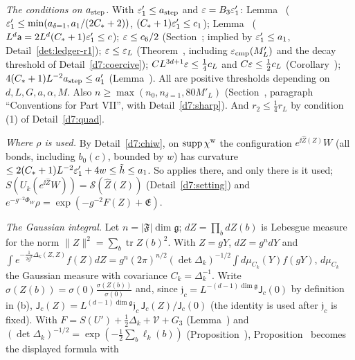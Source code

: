 \begin{detail}\label{d7:step}
\begin{step}
\emph{The conditions on $a_{\rm step}$.} With $\varepsilon'_1\le a_{\rm step}$ and $\varepsilon=B_3\varepsilon'_1$: Lemma~ ($\varepsilon'_1\le\min(a_{\delta=1},a_1/(2C_*+2))$, $(C_*+1)\varepsilon'_1\le c_1$); Lemma~ ($L^d\mathsf a=2L^d(C_*+1)\varepsilon'_1\le c$); $\varepsilon\le c_6/2$ (Section~; implied by $\varepsilon'_1\le a_1$, Detail~\ref{det:ledger-r1}); $\varepsilon\le\varepsilon_L$ (Theorem~, including $\varepsilon_{\rm cmp}(M'_L)$ and the decay threshold of Detail~\ref{d7:coercive}); $CL^{3d+1}\varepsilon\le\frac14c_L$ and $C\varepsilon\le\frac12c_L$ (Corollary~); $4(C_*+1)L^{-2}a_{\rm step}\le a'_1$ (Lemma~). All are positive thresholds depending on $d,L,G,a,\alpha,M$. Also $n\ge\max(n_0,n_{\delta=1},80M'_L)$ (Section~, paragraph ``Conventions for Part VII'', with Detail~\ref{d7:sharp}). And $r_2\le\frac14r_L$ by condition (1) of Detail~\ref{d7:quad}.
\end{step}
\begin{step}
\emph{Where $\rho$ is used.} By Detail~\ref{d7:chiw}, on $\operatorname{supp}\chi^{\rm w}$ the configuration $e^{\ii\hat Z(Z)}W$ (all bonds, including $b_0(c)$, bounded by $w$) has curvature $\le2(C_*+1)L^{-2}\varepsilon'_1+4w\le\tilde h\le a_1$. So  applies there, and only there is it used; $S(U_k(e^{\ii\hat Z}W))=\mathcal S(\hat Z(Z))$ (Detail~\ref{d7:setting}) and $e^{-g^{-2}\Phi_W}\rho=\exp(-g^{-2}F(Z)+\mathfrak E)$.
\end{step}
\begin{step}
\emph{The Gaussian integral.} Let $n=|\mathfrak F|\dim\mathfrak g$; $dZ=\prod_bdZ(b)$ is Lebesgue measure for the norm $\|Z\|^2=\sum_b\operatorname{tr}Z(b)^2$. With $Z=gY$, $dZ=g^ndY$ and $\int e^{-\frac1{2g^2}\Delta_k(Z,Z)}f(Z)dZ=g^n(2\pi)^{n/2}(\det\Delta_k)^{-1/2}\int d\mu_{C_k}(Y)f(gY)$, $d\mu_{C_k}$ the Gaussian measure with covariance $C_k=\Delta_k^{-1}$. Write $\sigma(Z(b))=\sigma(0)\frac{\sigma(Z(b))}{\sigma(0)}$ and, since $\mathfrak j_c=L^{-(d-1)\dim\mathfrak g}\mathsf J_c(0)$ by definition in (b), $\mathsf J_c(Z)=L^{(d-1)\dim\mathfrak g}\mathfrak j_c\,\mathsf J_c(Z)/\mathsf J_c(0)$ (the identity is used after $\mathfrak j_c$ is fixed). With $F=S(U')+\frac12\Delta_k+\mathcal V+G_3$ (Lemma~) and $(\det\Delta_k)^{-1/2}=\exp(-\frac12\sum_b\ell_k(b))$ (Proposition~), Proposition~ becomes the displayed formula with

\end{step}
\end{detail}

